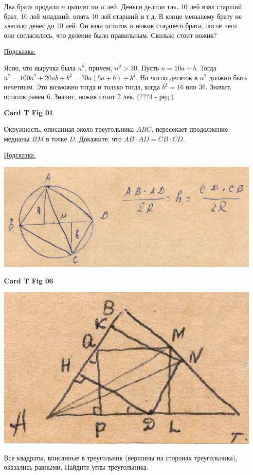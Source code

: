 \documentclass[12pt,a4paper]{article}
\begin{document}
Два брата продали $n$ цыплят по  $n$ лей. Деньги делили так. 10 лей взял старший брат, 10 лей младший, опять 10 лей старший и т.д. В конце меньшему брату не хватило денег до 10 лей. Он взял остаток и ножик старшего брата, после чего они согласились, что деление было правильным. Сколько стоит ножик?

\underline{Подсказка:}

Ясно, что выручка была $n^2$, причем, $n^2>30$. Пусть $n=10a+b$. Тогда $n^2=100a^2+20ab+b^2=20a(5a+b)+b^2$. Но число десяток в $n^2$ должно быть нечетным. Это возможно тогда и только тогда, когда $b^2=16$ или $36$. Значит, остаток равен 6. Значит, ножик стоит 2 лея. (???4 - ред.)


\bigskip
\noindent\textbf{Card T Fig 01}
\medskip
{}

Окружность, описанная около треугольника $ABC$, пересекает продолжение медианы $BM$ в точке $D$. Докажите, что $AB\cdot AD=CB\cdot CD$.

\underline{Подсказка:}
\begin{center}
	\includegraphics[width=\textwidth]{Card_T_Fig1_1.eps}
\end{center}

\bigskip
{}
\noindent\textbf{Card T Fig 06}
\medskip
{}

\noindent \begin{minipage}{6cm}
	\includegraphics[width=\textwidth]{Card_T_Fig6_1.eps}
\end{minipage}\quad 	
\begin{minipage}{7cm}
	Все квадраты, вписанные в треугольник (вершины на сторонах треугольника), оказались равными. Найдите углы треугольника.
\end{minipage}
\end{document}

